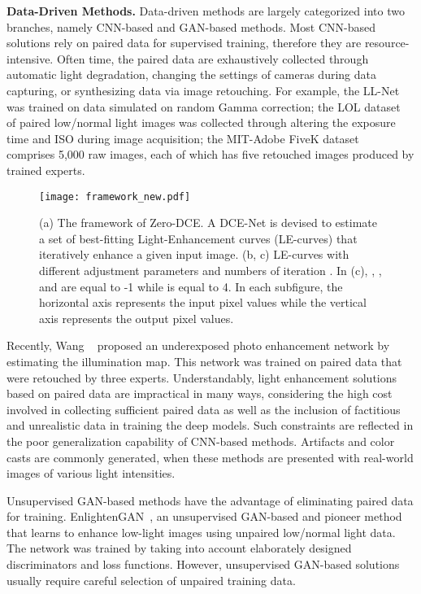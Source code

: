 \documentclass[10pt,twocolumn,letterpaper]{article}
\begin{document}
\noindent
\textbf{Data-Driven Methods.}
Data-driven methods are largely categorized into two branches, namely CNN-based and GAN-based methods. Most CNN-based solutions rely on paired data for supervised training, therefore they are resource-intensive. Often time, the paired data are exhaustively collected through automatic light degradation, changing the settings of cameras during data capturing, or synthesizing data via image retouching. For example, the LL-Net~\cite{Lore2017} was trained on data simulated on random Gamma correction; the LOL dataset~\cite{Chen2018} of paired low/normal light images was collected through altering the exposure time and ISO during image acquisition; the MIT-Adobe FiveK dataset~\cite{Adobe5K} comprises 5,000 raw images, each of which has five retouched images produced by trained experts. \begin{figure*}[t]
	\centering
	\centerline{\texttt{[image: framework\_new.pdf]}}
	\vspace{-0.4cm}
	\caption{(a) The framework of Zero-DCE. A DCE-Net is devised to estimate a set of best-fitting Light-Enhancement curves (LE-curves) that iteratively enhance a given input image. (b, c) LE-curves with different adjustment parameters  and numbers of iteration . In (c), , , and  are equal to -1 while  is equal to 4. In each subfigure, the horizontal axis represents the input pixel values while the vertical axis represents the output pixel values. }
	\label{fig:pipeline}
	\vspace{-0.4cm}
\end{figure*}

Recently, Wang \etal~\cite{Wang2019} proposed an underexposed photo enhancement network by estimating the illumination map. This network was trained on paired data that were retouched by three experts.
Understandably, light enhancement solutions based on paired data are impractical in many ways, considering the high cost involved in collecting sufficient paired data as well as the inclusion of factitious and unrealistic data in training the deep models. Such constraints are reflected in the poor generalization capability of CNN-based methods. Artifacts and color casts are commonly generated, when these methods are presented with real-world images of various light intensities.



Unsupervised GAN-based methods have the advantage of eliminating paired data for training. EnlightenGAN~\cite{Jiang2019}, an unsupervised GAN-based and pioneer method that learns to enhance low-light images using unpaired low/normal light data. The network was trained by taking into account elaborately designed discriminators and loss functions. However, unsupervised GAN-based solutions usually require careful selection of unpaired training data.
\end{document}
